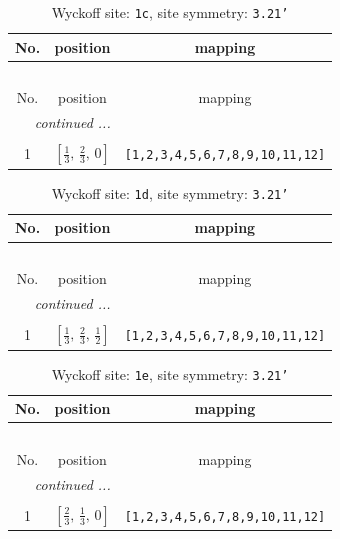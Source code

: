 \documentclass[fleqn,8pt]{jsarticle}
\begin{document}
\begin{longtable}{ccc}
\caption{Wyckoff site: {\tt 1c}, site symmetry: {\tt 3.21'}}
 \\
 \hline \hline
No. & position & mapping \\ \hline \endfirsthead

\multicolumn{2}{l}{\tablename\ \thetable{}} \\
 \hline \hline
No. & position & mapping \\ \hline \endhead

 \hline \hline
\multicolumn{2}{r}{\footnotesize\it continued ...} \\ \endfoot

 \hline \hline
\multicolumn{2}{r}{} \\ \endlastfoot

1 & $\left[ \frac{1}{3},\, \frac{2}{3},\, 0 \right]$ & {\tt [1,2,3,4,5,6,7,8,9,10,11,12]} \\
\end{longtable}
\renewcommand{\arraystretch}{1.2}
\begin{longtable}{ccc}
\caption{Wyckoff site: {\tt 1d}, site symmetry: {\tt 3.21'}}
 \\
 \hline \hline
No. & position & mapping \\ \hline \endfirsthead

\multicolumn{2}{l}{\tablename\ \thetable{}} \\
 \hline \hline
No. & position & mapping \\ \hline \endhead

 \hline \hline
\multicolumn{2}{r}{\footnotesize\it continued ...} \\ \endfoot

 \hline \hline
\multicolumn{2}{r}{} \\ \endlastfoot

1 & $\left[ \frac{1}{3},\, \frac{2}{3},\, \frac{1}{2} \right]$ & {\tt [1,2,3,4,5,6,7,8,9,10,11,12]} \\
\end{longtable}
\renewcommand{\arraystretch}{1.2}
\begin{longtable}{ccc}
\caption{Wyckoff site: {\tt 1e}, site symmetry: {\tt 3.21'}}
 \\
 \hline \hline
No. & position & mapping \\ \hline \endfirsthead

\multicolumn{2}{l}{\tablename\ \thetable{}} \\
 \hline \hline
No. & position & mapping \\ \hline \endhead

 \hline \hline
\multicolumn{2}{r}{\footnotesize\it continued ...} \\ \endfoot

 \hline \hline
\multicolumn{2}{r}{} \\ \endlastfoot

1 & $\left[ \frac{2}{3},\, \frac{1}{3},\, 0 \right]$ & {\tt [1,2,3,4,5,6,7,8,9,10,11,12]} \\
\end{longtable}
\end{document}
